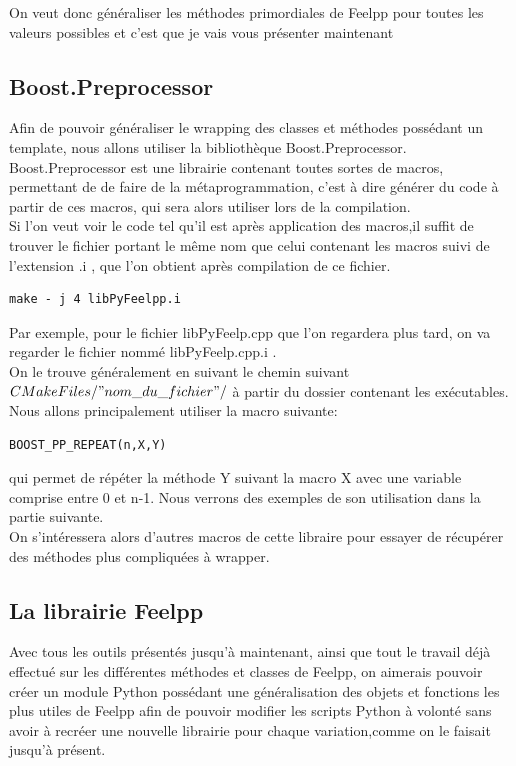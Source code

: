 \documentclass[french,12pt]{article}
\begin{document}
On veut donc généraliser les méthodes primordiales de Feelpp pour toutes les valeurs possibles et c'est que je vais vous présenter maintenant

\subsection{Boost.Preprocessor}

Afin de pouvoir généraliser le wrapping des classes et méthodes possédant un template, nous allons utiliser la bibliothèque Boost.Preprocessor.\\

Boost.Preprocessor est une librairie contenant toutes sortes de macros, permettant de de faire de la métaprogrammation, c'est à dire générer du code à partir de ces macros, qui sera alors utiliser lors de la compilation.\\

Si l'on veut voir le code tel qu'il est après application des macros,il suffit de trouver le fichier portant le même nom que celui contenant les macros suivi de l'extension .i , que l'on obtient après compilation de ce fichier.
\begin{lstlisting}
make - j 4 libPyFeelpp.i
\end{lstlisting}

Par exemple, pour le fichier libPyFeelp.cpp que l'on regardera plus tard, on va regarder le fichier nommé libPyFeelp.cpp.i .\\
On le trouve généralement en suivant le chemin suivant $CMakeFiles/"nom\_du\_fichier"/$ à partir du dossier contenant les exécutables.\\

Nous allons principalement utiliser la macro suivante:
\begin{lstlisting}
BOOST_PP_REPEAT(n,X,Y)
\end{lstlisting}
qui permet de répéter la méthode Y suivant la macro X avec une variable comprise entre 0 et n-1. Nous verrons des exemples de son utilisation dans la partie suivante.\\

On s'intéressera alors d'autres macros de cette libraire pour essayer de récupérer des méthodes plus compliquées à wrapper.

\subsection{La librairie Feelpp}

Avec tous les outils présentés jusqu'à maintenant, ainsi que tout le travail déjà effectué sur les différentes méthodes et classes de Feelpp, on aimerais pouvoir créer un module Python possédant une généralisation des objets et fonctions les plus utiles de Feelpp afin de pouvoir modifier les scripts Python à volonté sans avoir à recréer une nouvelle librairie pour chaque variation,comme on le faisait jusqu'à présent.\\
\end{document}
